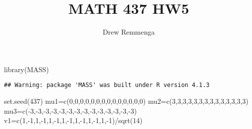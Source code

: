 \documentclass[
]{article}
\title{MATH 437 HW5}
\author{Drew Remmenga}
\date{}
\newenvironment{Shaded}{\begin{snugshade}}{\end{snugshade}}
\newcommand{\DecValTok}[1]{\textcolor[rgb]{0.00,0.00,0.81}{#1}}
\newcommand{\FunctionTok}[1]{\textcolor[rgb]{0.00,0.00,0.00}{#1}}
\newcommand{\NormalTok}[1]{#1}
\newcommand{\OtherTok}[1]{\textcolor[rgb]{0.56,0.35,0.01}{#1}}
\newcommand{\SpecialCharTok}[1]{\textcolor[rgb]{0.00,0.00,0.00}{#1}}
\begin{document}
\maketitle

\begin{Shaded}
\begin{Highlighting}[]
\FunctionTok{library}\NormalTok{(MASS)}
\end{Highlighting}
\end{Shaded}

\begin{verbatim}
## Warning: package 'MASS' was built under R version 4.1.3
\end{verbatim}

\begin{Shaded}
\begin{Highlighting}[]
\FunctionTok{set.seed}\NormalTok{(}\DecValTok{437}\NormalTok{)}
\NormalTok{mu1}\OtherTok{=}\FunctionTok{c}\NormalTok{(}\DecValTok{0}\NormalTok{,}\DecValTok{0}\NormalTok{,}\DecValTok{0}\NormalTok{,}\DecValTok{0}\NormalTok{,}\DecValTok{0}\NormalTok{,}\DecValTok{0}\NormalTok{,}\DecValTok{0}\NormalTok{,}\DecValTok{0}\NormalTok{,}\DecValTok{0}\NormalTok{,}\DecValTok{0}\NormalTok{,}\DecValTok{0}\NormalTok{,}\DecValTok{0}\NormalTok{,}\DecValTok{0}\NormalTok{,}\DecValTok{0}\NormalTok{)}
\NormalTok{mu2}\OtherTok{=}\FunctionTok{c}\NormalTok{(}\DecValTok{3}\NormalTok{,}\DecValTok{3}\NormalTok{,}\DecValTok{3}\NormalTok{,}\DecValTok{3}\NormalTok{,}\DecValTok{3}\NormalTok{,}\DecValTok{3}\NormalTok{,}\DecValTok{3}\NormalTok{,}\DecValTok{3}\NormalTok{,}\DecValTok{3}\NormalTok{,}\DecValTok{3}\NormalTok{,}\DecValTok{3}\NormalTok{,}\DecValTok{3}\NormalTok{,}\DecValTok{3}\NormalTok{,}\DecValTok{3}\NormalTok{)}
\NormalTok{mu3}\OtherTok{=}\FunctionTok{c}\NormalTok{(}\SpecialCharTok{{-}}\DecValTok{3}\NormalTok{,}\SpecialCharTok{{-}}\DecValTok{3}\NormalTok{,}\SpecialCharTok{{-}}\DecValTok{3}\NormalTok{,}\SpecialCharTok{{-}}\DecValTok{3}\NormalTok{,}\SpecialCharTok{{-}}\DecValTok{3}\NormalTok{,}\SpecialCharTok{{-}}\DecValTok{3}\NormalTok{,}\SpecialCharTok{{-}}\DecValTok{3}\NormalTok{,}\SpecialCharTok{{-}}\DecValTok{3}\NormalTok{,}\SpecialCharTok{{-}}\DecValTok{3}\NormalTok{,}\SpecialCharTok{{-}}\DecValTok{3}\NormalTok{,}\SpecialCharTok{{-}}\DecValTok{3}\NormalTok{,}\SpecialCharTok{{-}}\DecValTok{3}\NormalTok{,}\SpecialCharTok{{-}}\DecValTok{3}\NormalTok{,}\SpecialCharTok{{-}}\DecValTok{3}\NormalTok{)}
\NormalTok{v1}\OtherTok{=}\FunctionTok{c}\NormalTok{(}\DecValTok{1}\NormalTok{,}\SpecialCharTok{{-}}\DecValTok{1}\NormalTok{,}\DecValTok{1}\NormalTok{,}\SpecialCharTok{{-}}\DecValTok{1}\NormalTok{,}\DecValTok{1}\NormalTok{,}\SpecialCharTok{{-}}\DecValTok{1}\NormalTok{,}\DecValTok{1}\NormalTok{,}\SpecialCharTok{{-}}\DecValTok{1}\NormalTok{,}\DecValTok{1}\NormalTok{,}\SpecialCharTok{{-}}\DecValTok{1}\NormalTok{,}\DecValTok{1}\NormalTok{,}\SpecialCharTok{{-}}\DecValTok{1}\NormalTok{,}\DecValTok{1}\NormalTok{,}\SpecialCharTok{{-}}\DecValTok{1}\NormalTok{)}\SpecialCharTok{/}\FunctionTok{sqrt}\NormalTok{(}\DecValTok{14}\NormalTok{)}

\end{Highlighting}
\end{Shaded}
\end{document}
